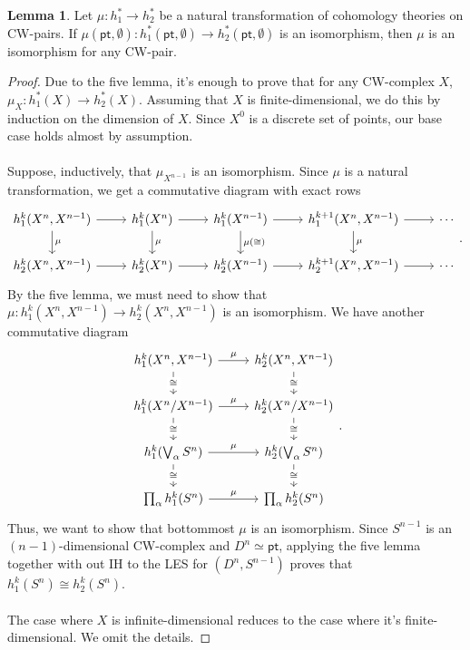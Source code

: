 \documentclass[10pt,letterpaper,cm]{nupset}
\theoremstyle{definition}
\theoremstyle{theorem}
\newtheorem{lemma}[definition]{Lemma}
\theoremstyle{remark}
\newcommand{\1}{\mathbb{1}}
\newcommand{\0}{\vec 0}
\newcommand{\pt}{\mathsf{pt}}
\begin{document}
\begin{lemma}
Let $\mu : h^{\ast}_1 \to h^{\ast}_2$ be a natural transformation of cohomology theories on CW-pairs. If $\mu(\pt, \emptyset) : h_1^{\ast}(\pt, \emptyset) \to h_2^{\ast}(\pt, \emptyset)$ is an isomorphism, then $\mu$ is an isomorphism for any CW-pair.
\end{lemma}
\begin{proof}
Due to the five lemma, it's enough to prove that for any CW-complex $X$, $\mu_X : h_1^{\ast}(X) \to h_2^{\ast}(X)$. Assuming that $X$ is finite-dimensional, we do this by induction on the dimension of $X$. Since $X^0$ is a discrete set of points, our base case holds almost by assumption.  
\\ \\ Suppose, inductively, that $\mu_{X^{n-1}}$ is an isomorphism. Since $\mu$ is a natural transformation, we get a commutative diagram with exact rows
\[
\begin{tikzcd}
{h_1^k(X^n, X^{n-1})} \arrow[r] \arrow[d, "\mu"] & h_1^k(X^n) \arrow[r] \arrow[d, "\mu"] & h_1^k(X^{n-1}) \arrow[r] \arrow[d, "\mu(\cong)"] & {h_1^{k+1}(X^n, X^{n-1})} \arrow[r] \arrow[d, "\mu"] & \cdots \\
{h_2^k(X^n, X^{n-1})} \arrow[r]                  & h_2^k(X^n) \arrow[r]                  & h_2^k(X^{n-1}) \arrow[r]                         & {h_2^{k+1}(X^n, X^{n-1})} \arrow[r]                  & \cdots
\end{tikzcd}.
\] By the five lemma, we must need to show that $\mu : h_1^k(X^n, X^{n-1}) \to h_2^k(X^n, X^{n-1})$ is an isomorphism. We have another commutative diagram
\[
\begin{tikzcd}
{h_1^k(X^n, X^{n-1})} \arrow[d, "\cong" description] \arrow[r, "\mu"]       & {h_2^k(X^n, X^{n-1})} \arrow[d, "\cong" description]       \\
h_1^k(X^n/X^{n-1}) \arrow[d, "\cong" description] \arrow[r, "\mu"]          & h_2^k(X^n/X^{n-1}) \arrow[d, "\cong" description]          \\
h_1^k(\bigvee_{\alpha} S^n) \arrow[d, "\cong" description] \arrow[r, "\mu"] & h_2^k(\bigvee_{\alpha} S^n) \arrow[d, "\cong" description] \\
\prod_{\alpha}h_1^k(S^n) \arrow[r, "\mu"]                                   & \prod_{\alpha}h_2^k(S^n)                                  
\end{tikzcd}
.\] Thus, we want to show that bottommost $\mu$ is an isomorphism. Since $S^{n-1}$ is an $(n-1)$-dimensional CW-complex and $D^n \simeq \pt$, applying the five lemma together with out IH to the LES for $(D^n, S^{n-1})$ proves that $h_1^k(S^n) \cong h_2^k(S^n)$.
\\ \\ The case where $X$ is infinite-dimensional reduces to the case where it's finite-dimensional. We omit the details. 
\end{proof}
\end{document}
